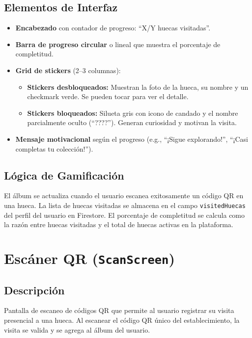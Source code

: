 \documentclass[11pt, a4paper, oneside]{report}
\begin{document}
\subsection{Elementos de Interfaz}
\begin{itemize}
  \item \textbf{Encabezado} con contador de progreso: ``X/Y huecas visitadas''.
  \item \textbf{Barra de progreso circular} o lineal que muestra el porcentaje de completitud.
  \item \textbf{Grid de stickers} (2--3 columnas):
  \begin{itemize}
    \item \textbf{Stickers desbloqueados:} Muestran la foto de la hueca, su nombre y un checkmark verde. Se pueden tocar para ver el detalle.
    \item \textbf{Stickers bloqueados:} Silueta gris con icono de candado y el nombre parcialmente oculto (``????''). Generan curiosidad y motivan la visita.
  \end{itemize}
  \item \textbf{Mensaje motivacional} según el progreso (e.g., ``¡Sigue explorando!'', ``¡Casi completas tu colección!'').
\end{itemize}

\subsection{Lógica de Gamificación}
El álbum se actualiza cuando el usuario escanea exitosamente un código QR en una hueca. La lista de huecas visitadas se almacena en el campo \texttt{visitedHuecas} del perfil del usuario en Firestore. El porcentaje de completitud se calcula como la razón entre huecas visitadas y el total de huecas activas en la plataforma.

\section{Escáner QR (\texttt{ScanScreen})}

\subsection{Descripción}
Pantalla de escaneo de códigos QR que permite al usuario registrar su visita presencial a una hueca. Al escanear el código QR único del establecimiento, la visita se valida y se agrega al álbum del usuario.
\end{document}
